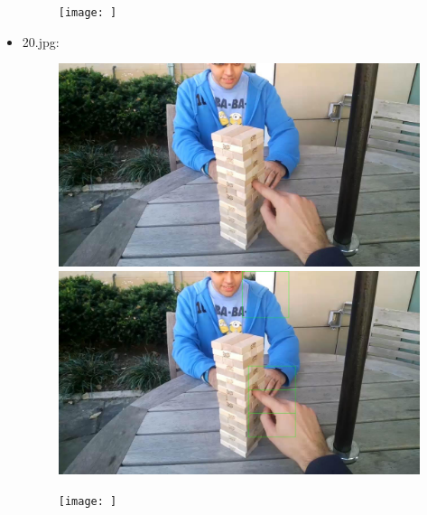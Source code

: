 \begin{itemize}
\begin{figure}[!htb]
\begin{minipage}{0.33\textwidth}
            \end{minipage}\hfill
            \begin{minipage}{0.33\textwidth}
                \centering
                \texttt{[image: ]}
            \end{minipage}
        \end{figure}
    \item 20.jpg:
        \begin{figure}[!htb]
            \begin{minipage}{0.33\textwidth}
            \centering
            \includegraphics[scale = 0.135]{images/results/original/20.jpg}
            \end{minipage}\hfill
            \begin{minipage}{0.33\textwidth}
                \centering
                \includegraphics[scale = 0.135]{images/results/detection/20_detections.jpg}
            \end{minipage}\hfill
            \begin{minipage}{0.33\textwidth}
                \centering
                \texttt{[image: ]}
            \end{minipage}

\end{figure}
\end{itemize}
